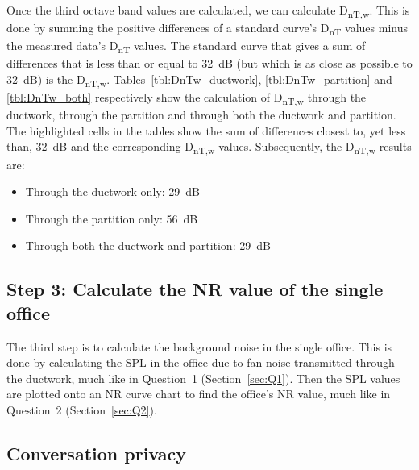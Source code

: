 Once the third octave band values are calculated, we can calculate D\textsubscript{nT,w}.
This is done by summing the positive differences of a standard curve's D\textsubscript{nT} values minus the measured data's D\textsubscript{nT} values.
The standard curve that gives a sum of differences that is less than or equal to 32~dB (but which is as close as possible to 32~dB) is the D\textsubscript{nT,w}.
Tables~\ref{tbl:DnTw_ductwork}, \ref{tbl:DnTw_partition} and \ref{tbl:DnTw_both} respectively show the calculation of D\textsubscript{nT,w} through the ductwork, through the partition and through both the ductwork and partition.
The highlighted cells in the tables show the sum of differences closest to, yet less than, 32~dB and the corresponding D\textsubscript{nT,w} values.
Subsequently, the D\textsubscript{nT,w} results are:
\begin{itemize}
	\item Through the ductwork only: 29~dB
	\item Through the partition only: 56~dB
	\item Through both the ductwork and partition: 29~dB
\end{itemize}


	








\subsection{Step 3: Calculate the NR value of the single office} \label{sec:Q4.3}

The third step is to calculate the background noise in the single office.
This is done by calculating the SPL in the office due to fan noise transmitted through the ductwork, much like in Question~1 (Section~\ref{sec:Q1}).
Then the SPL values are plotted onto an NR curve chart to find the office's NR value, much like in Question~2 (Section~\ref{sec:Q2}).





\subsection{Conversation privacy} \label{sec:Q4.4}

